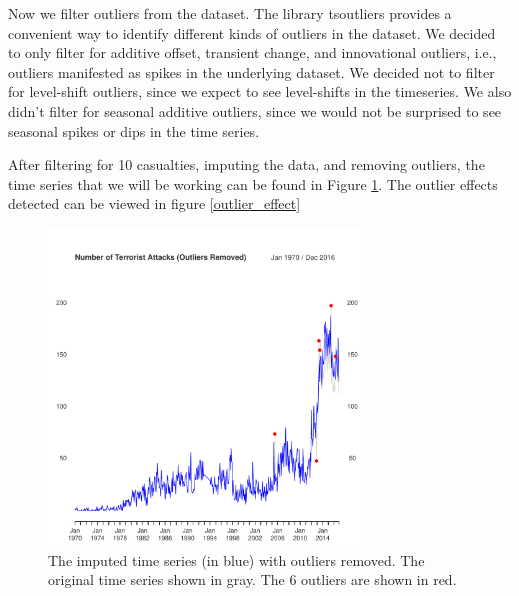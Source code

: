 \documentclass[11pt]{paper}
\begin{document}
Now we filter outliers from the dataset. The library tsoutliers provides a convenient way to identify different kinds of outliers in the dataset. We decided to only filter for additive offset, transient change, and innovational outliers, i.e., outliers manifested as spikes in the underlying dataset. We decided not to filter for level-shift outliers, since we expect to see level-shifts in the timeseries. We also didn’t filter for seasonal additive outliers, since we would not be surprised to see seasonal spikes or dips in the time series.

After filtering for 10 casualties, imputing the data, and removing outliers, the time series that we will be working can be found in Figure \ref{outlier}. The outlier effects detected can be viewed in figure \ref{outlier_effect}

\begin{figure}
\centering
    \includegraphics[width=0.75\textwidth]{../image/outlier_comparison.pdf}
\caption{The imputed time series (in blue) with outliers removed. The original time series shown in gray. The 6 outliers are shown in red. }
\label{outlier}
\end{figure}
\end{document}
